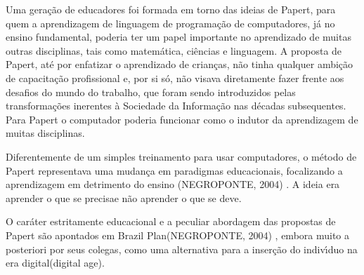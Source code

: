 \documentclass[
12pt,		%
openright,	%
twoside,  %
a4paper,			%
chapter=TITLE,		%
english,			%
french,				%
spanish,			%
brazil				%
]{USPSC-classe/USPSC}
\begin{document}
Uma gera\c{c}\~ao de educadores foi formada em torno das ideias de Papert, para quem a aprendizagem de linguagem de programa\c{c}\~ao de computadores, j\'a no ensino fundamental, poderia ter um papel importante no aprendizado de muitas outras disciplinas, tais como matem\'atica, ci\^encias e linguagem. A proposta de Papert, at\'e por enfatizar o aprendizado de crian\c{c}as, n\~ao tinha qualquer ambi\c{c}\~ao de capacita\c{c}\~ao profissional e, por si s\'o, n\~ao visava diretamente fazer frente aos desafios do \textquotedbl mundo do trabalho\textquotedbl , que foram sendo introduzidos pelas transforma\c{c}\~oes inerentes \`a Sociedade da Informa\c{c}\~ao nas d\'ecadas subsequentes. Para Papert o computador poderia funcionar como o indutor da aprendizagem de muitas disciplinas.

















Diferentemente de um simples treinamento para usar computadores, o m\'etodo de Papert representava uma mudan\c{c}a em paradigmas educacionais, focalizando a aprendizagem em detrimento do ensino  (NEGROPONTE, 2004) . A ideia era \textquotedbl aprender o que se precisa\textquotedbl  e n\~ao \textquotedbl aprender o que se deve\textquotedbl .

















O car\'ater estritamente educacional e a peculiar abordagem das propostas de Papert s\~ao apontados em \textquotedbl Brazil Plan\textquotedbl   (NEGROPONTE, 2004) , embora muito a posteriori por seus colegas, como uma alternativa para a inser\c{c}\~ao do indiv\'{\i}duo na \textquotedbl era digital\textquotedbl  (digital age).
\end{document}
